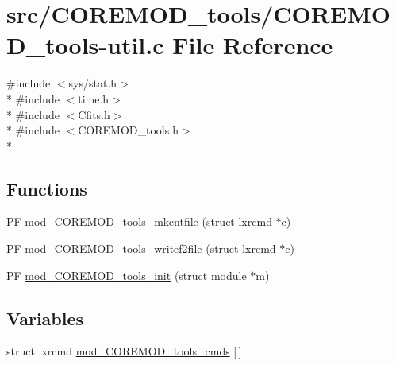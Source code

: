 \hypertarget{src_2COREMOD__tools_2COREMOD__tools-util_8c}{\section{src/\+C\+O\+R\+E\+M\+O\+D\+\_\+tools/\+C\+O\+R\+E\+M\+O\+D\+\_\+tools-\/util.c File Reference}
\label{src_2COREMOD__tools_2COREMOD__tools-util_8c}
}
{\ttfamily \#include $<$sys/stat.\+h$>$}\\*
{\ttfamily \#include $<$time.\+h$>$}\\*
{\ttfamily \#include $<$Cfits.\+h$>$}\\*
{\ttfamily \#include $<$C\+O\+R\+E\+M\+O\+D\+\_\+tools.\+h$>$}\\*
\subsection*{Functions}
\begin{DoxyCompactItemize}
\item 
P\+F \hyperlink{src_2COREMOD__tools_2COREMOD__tools-util_8c_a06f48d4a86a2fdc9584bf9dc2327e489}{mod\+\_\+\+C\+O\+R\+E\+M\+O\+D\+\_\+tools\+\_\+mkcntfile} (struct lxrcmd $\ast$c)
\item 
P\+F \hyperlink{src_2COREMOD__tools_2COREMOD__tools-util_8c_ac71b29b59c1655b692adec27db89a5dd}{mod\+\_\+\+C\+O\+R\+E\+M\+O\+D\+\_\+tools\+\_\+writef2file} (struct lxrcmd $\ast$c)
\item 
P\+F \hyperlink{src_2COREMOD__tools_2COREMOD__tools-util_8c_aa4a40bdadb3c1cfa417640f3cee38a62}{mod\+\_\+\+C\+O\+R\+E\+M\+O\+D\+\_\+tools\+\_\+init} (struct module $\ast$m)
\end{DoxyCompactItemize}
\subsection*{Variables}
\begin{DoxyCompactItemize}
\item 
struct lxrcmd \hyperlink{src_2COREMOD__tools_2COREMOD__tools-util_8c_adcd4eaaac246d65e6d23ad5e6f5d411d}{mod\+\_\+\+C\+O\+R\+E\+M\+O\+D\+\_\+tools\+\_\+cmds} \mbox{[}$\,$\mbox{]}
\end{DoxyCompactItemize}


